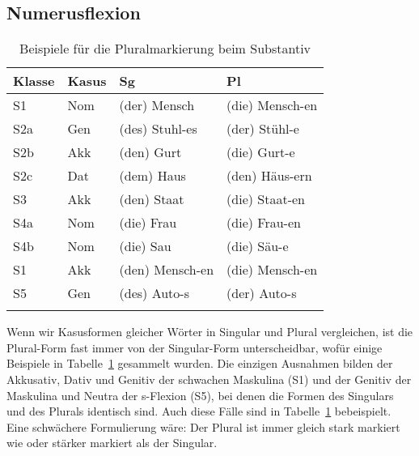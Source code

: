 \subsection{Numerusflexion}

\label{sec:pluralmark}

\begin{table}[!htbp]
  \centering
  \begin{tabular}{llll}
    \lsptoprule
    \textbf{Klasse} & \textbf{Kasus} & \textbf{Sg} & \textbf{Pl} \\
    \midrule
    S1 & Nom & (der) Mensch & (die) Mensch-en \\
    S2a & Gen & (des) Stuhl-es & (der) Stühl-e \\
    S2b & Akk & (den) Gurt & (die) Gurt-e \\
    S2c & Dat & (dem) Haus & (den) Häus-ern \\
    S3 & Akk & (den) Staat & (die) Staat-en \\
    S4a & Nom & (die) Frau & (die) Frau-en \\
    S4b & Nom & (die) Sau & (die) Säu-e \\
    \midrule
    S1 & Akk & (den) Mensch-en & (die) Mensch-en \\
    S5 & Gen & (des) Auto-s & (der) Auto-s \\
    \lspbottomrule
  \end{tabular}
  \caption{Beispiele für die Pluralmarkierung beim Substantiv}
  \label{tab:sgplvergl}
\end{table}

Wenn wir Kasusformen gleicher Wörter in Singular und Plural vergleichen, ist die Plural-Form fast immer von der Singular-Form unterscheidbar, wofür einige Beispiele in Tabelle~\ref{tab:sgplvergl} gesammelt wurden.
Die einzigen Ausnahmen bilden der Akkusativ, Dativ und Genitiv der schwachen Maskulina (S1) und der Genitiv der Maskulina und Neutra der s-Flexion (S5), bei denen die Formen des Singulars und des Plurals identisch sind.
Auch diese Fälle sind in Tabelle~\ref{tab:sgplvergl} bebeispielt.
Eine schwächere Formulierung wäre:
Der Plural ist immer gleich stark markiert wie oder stärker markiert als der Singular.

